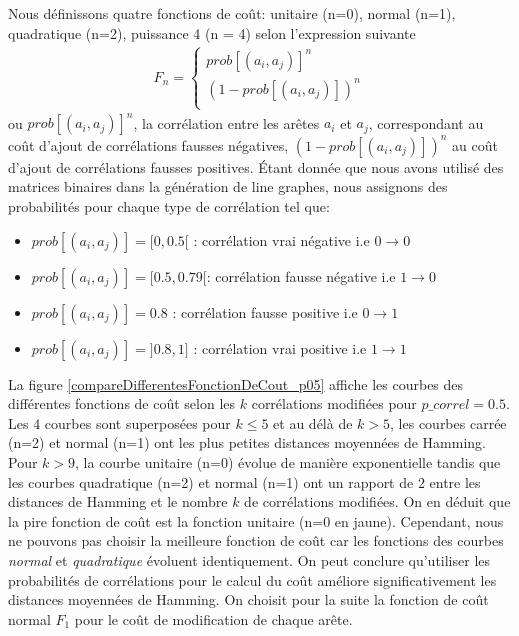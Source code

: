 \documentclass[onecolumn, 12pt]{book}
\begin{document}
Nous d\'efinissons quatre fonctions de co\^ut: unitaire (n=0), normal (n=1), quadratique (n=2), puissance 4 (n = 4) selon l'expression suivante
\begin{equation}
	\begin{aligned}
	F_n = 
	\begin{cases}
		prob[(a_i,a_j)]^n   \\
		(1 - prob[(a_i,a_j)])^n \\
	\end{cases}
	\end{aligned}
\end{equation}
ou $prob[(a_i,a_j)]^n$, la corr\'elation entre les ar\^etes $a_i$ et $a_j$, correspondant au co\^ut d'ajout de corr\'elations fausses n\'egatives, 
$(1-prob[(a_i,a_j)])^n$ au co\^ut d'ajout de corr\'elations fausses positives.
\newline
\'Etant donn\'ee que nous avons utilis\'e des matrices binaires dans la g\'en\'eration de line graphes, nous assignons des probabilit\'es pour chaque type de corr\'elation tel que:
\begin{itemize}
\item $prob[(a_i,a_j)] = [0, 0.5[ $ : corr\'elation vrai n\'egative i.e $0 \rightarrow 0$
\item $prob[(a_i,a_j)] = [0.5, 0.79[ $: corr\'elation fausse n\'egative i.e $1 \rightarrow 0$
\item $prob[(a_i,a_j)] = 0.8 $ : corr\'elation fausse positive i.e $0 \rightarrow 1$
\item $prob[(a_i,a_j)] = ]0.8, 1] $ : corr\'elation vrai positive i.e $1 \rightarrow 1$
\end{itemize}
La figure \ref{compareDifferentesFonctionDeCout_p05} affiche les courbes des diff\'erentes fonctions de co\^ut selon les $k$ corr\'elations modifi\'ees pour $p\_correl = 0.5$.
\newline
Les $4$ courbes sont superpos\'ees pour $k\le5$ et au d\'el\`a de $k>5$, les courbes carr\'ee (n=2) et normal (n=1) ont les plus petites distances moyenn\'ees de Hamming.
Pour $k>9$, la courbe unitaire (n=0) \'evolue de mani\`ere exponentielle tandis que les courbes quadratique (n=2) et normal (n=1) ont un rapport de $2$ entre les distances de Hamming et le nombre $k$ de corr\'elations modifi\'ees.
On en d\'eduit que la pire fonction de co\^ut est la fonction unitaire (n=0 en jaune).
\newline
Cependant, nous ne pouvons pas choisir la meilleure fonction de co\^ut car les fonctions des courbes {\em normal} et {\em quadratique} \'evoluent identiquement.
 On peut conclure qu'utiliser les probabilit\'es de corr\'elations pour le calcul du co\^ut am\'eliore significativement les distances moyenn\'ees de Hamming.
 \newline
 On choisit pour la suite la fonction de co\^ut normal $F_1$ pour le co\^ut de modification de chaque ar\^ete. 
\end{document}
